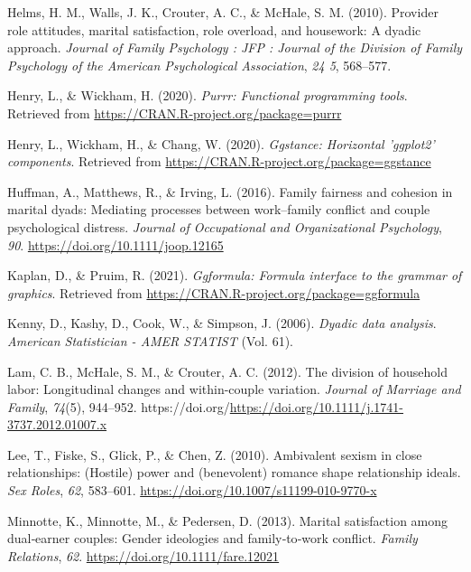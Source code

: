 \documentclass[
  man]{apa6}
\newlength{\cslhangindent}
\newlength{\cslentryspacingunit} %
\newenvironment{CSLReferences}[2] %
 {%
  \setlength{\parindent}{0pt}
  \ifodd #1
  \let\oldpar\par
  \def\par{\hangindent=\cslhangindent\oldpar}
  \fi
  \setlength{\parskip}{#2\cslentryspacingunit}
 }%
 {}
\begin{document}
\begin{CSLReferences}{1}{0}
\leavevmode{}%
Helms, H. M., Walls, J. K., Crouter, A. C., \& McHale, S. M. (2010). Provider role attitudes, marital satisfaction, role overload, and housework: A dyadic approach. \emph{Journal of Family Psychology : JFP : Journal of the Division of Family Psychology of the American Psychological Association}, \emph{24 5}, 568--577.

\leavevmode{}%
Henry, L., \& Wickham, H. (2020). \emph{Purrr: Functional programming tools}. Retrieved from \url{https://CRAN.R-project.org/package=purrr}

\leavevmode{}%
Henry, L., Wickham, H., \& Chang, W. (2020). \emph{Ggstance: Horizontal 'ggplot2' components}. Retrieved from \url{https://CRAN.R-project.org/package=ggstance}

\leavevmode{}%
Huffman, A., Matthews, R., \& Irving, L. (2016). Family fairness and cohesion in marital dyads: Mediating processes between work--family conflict and couple psychological distress. \emph{Journal of Occupational and Organizational Psychology}, \emph{90}. \url{https://doi.org/10.1111/joop.12165}

\leavevmode{}%
Kaplan, D., \& Pruim, R. (2021). \emph{Ggformula: Formula interface to the grammar of graphics}. Retrieved from \url{https://CRAN.R-project.org/package=ggformula}

\leavevmode{}%
Kenny, D., Kashy, D., Cook, W., \& Simpson, J. (2006). \emph{Dyadic data analysis}. \emph{American Statistician - AMER STATIST} (Vol. 61).

\leavevmode{}%
Lam, C. B., McHale, S. M., \& Crouter, A. C. (2012). The division of household labor: Longitudinal changes and within-couple variation. \emph{Journal of Marriage and Family}, \emph{74}(5), 944--952. https://doi.org/\url{https://doi.org/10.1111/j.1741-3737.2012.01007.x}

\leavevmode{}%
Lee, T., Fiske, S., Glick, P., \& Chen, Z. (2010). Ambivalent sexism in close relationships: (Hostile) power and (benevolent) romance shape relationship ideals. \emph{Sex Roles}, \emph{62}, 583--601. \url{https://doi.org/10.1007/s11199-010-9770-x}

\leavevmode{}%
Minnotte, K., Minnotte, M., \& Pedersen, D. (2013). Marital satisfaction among dual‐earner couples: Gender ideologies and family‐to‐work conflict. \emph{Family Relations}, \emph{62}. \url{https://doi.org/10.1111/fare.12021}


\end{CSLReferences}
\end{document}

